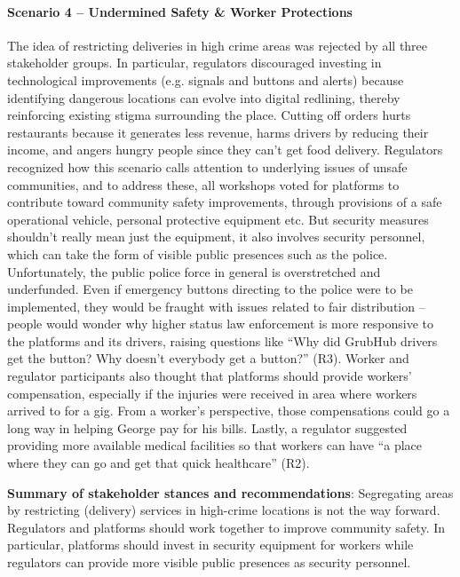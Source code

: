\paragraph{Scenario 4 -- Undermined Safety \& Worker Protections} \label{s4}
The idea of restricting deliveries in high crime areas was rejected by all three stakeholder groups. In particular, regulators discouraged investing in technological improvements (e.g. signals and buttons and alerts) because identifying dangerous locations can evolve into digital redlining, thereby reinforcing existing stigma surrounding the place. Cutting off orders hurts restaurants because it generates less revenue, harms drivers by reducing their income, and angers hungry people since they can't get food delivery. Regulators recognized how this scenario calls attention to underlying issues of unsafe communities, and to address these, all workshops voted for platforms to contribute toward community safety improvements, through provisions of a safe operational vehicle, personal protective equipment etc. But security measures shouldn't really mean just the equipment, it also involves security personnel, which can take the form of visible public presences such as the police. Unfortunately, the public police force in general is overstretched and underfunded. Even if emergency buttons directing to the police were to be implemented, they would be fraught with issues related to fair distribution -- people would wonder why higher status law enforcement is more responsive to the platforms and its drivers, raising questions like ``Why did GrubHub drivers get the button? Why doesn't everybody get a button?'' (R3). Worker and regulator participants also thought that platforms should provide workers' compensation, especially if the injuries were received in area where workers arrived to for a gig. From a worker's perspective, those compensations could go a long way in helping George pay for his bills. Lastly, a regulator suggested providing more available medical facilities so that workers can have ``a place where they can go and get that quick healthcare'' (R2).

\textbf{Summary of stakeholder stances and recommendations}: Segregating areas by restricting (delivery) services in  high-crime locations is not the way forward. Regulators and platforms should work together to improve community safety. In particular, platforms should invest in security equipment for workers while regulators can provide more visible public presences as security personnel. 


\FloatBarrier

